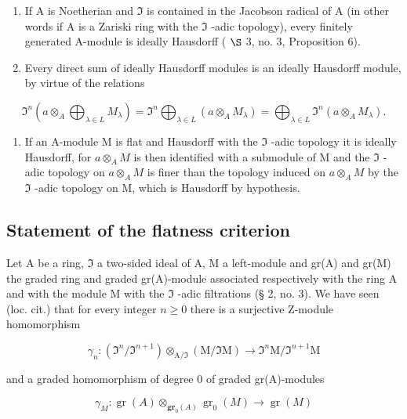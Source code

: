 \begin{enumerate}
\def\labelenumi{(\arabic{enumi})}
\item
  If A is Noetherian and \(\mathfrak{I}\) is contained in the Jacobson radical of A (in other words if A is a Zariski ring with the \(\mathfrak{I}\) -adic topology), every finitely generated A-module is ideally Hausdorff ( \(\S\) 3, no. 3, Proposition 6).
\item
  Every direct sum of ideally Hausdorff modules is an ideally Hausdorff module, by virtue of the relations
\end{enumerate}

\[
\Im^ {n} \left(a \otimes_ {A} \bigoplus_ {\lambda \in L} M _ {\lambda}\right) = \Im^ {n} \bigoplus_ {\lambda \in L} (a \otimes_ {A} M _ {\lambda}) = \bigoplus_ {\lambda \in L} \Im^ {n} (a \otimes_ {A} M _ {\lambda}).
\]

\begin{enumerate}
\def\labelenumi{(\arabic{enumi})}
\setcounter{enumi}{2}
\tightlist
\item
  If an A-module M is flat and Hausdorff with the \(\Im\) -adic topology it is ideally Hausdorff, for \(a \otimes_{A} M\) is then identified with a submodule of M and the \(\Im\) -adic topology on \(a \otimes_{A} M\) is finer than the topology induced on \(a \otimes_{A} M\) by the \(\Im\) -adic topology on M, which is Hausdorff by hypothesis.
\end{enumerate}

\subsection{Statement of the flatness criterion}

Let A be a ring, \(\mathfrak{I}\) a two-sided ideal of A, M a left-module and gr(A) and gr(M) the graded ring and graded gr(A)-module associated respectively with the ring A and with the module M with the \(\mathfrak{I}\) -adic filtrations (§ 2, no. 3). We have seen (loc. cit.) that for every integer \(n \geqslant 0\) there is a surjective Z-module homomorphism

\[
\gamma_ {n} \colon (\mathfrak {I} ^ {n} / \mathfrak {I} ^ {n + 1}) \otimes_ {\mathrm{A} / \mathfrak {I}} (\mathrm{M} / \mathfrak {I} \mathrm{M}) \rightarrow \mathfrak {I} ^ {n} \mathrm{M} / \mathfrak {I} ^ {n + 1} \mathrm{M}
\]

and a graded homomorphism of degree 0 of graded gr(A)-modules

\[
\gamma_ {M} \colon \operatorname{gr} (A) \otimes_ {\mathbf {g r} _ {0} (A)} \operatorname{gr} _ {0} (M) \to \operatorname{gr} (M)
\]


